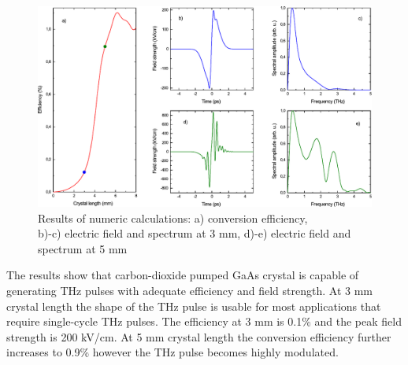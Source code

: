 \documentclass{article}
\begin{document}

\begin{figure}[H]\centering
\includegraphics[width=\textwidth]{graph1.pdf}
\caption{Results of numeric calculations: a) conversion efficiency, \\b)-c) electric field and spectrum at 3 mm, d)-e) electric field and spectrum at 5 mm}
\label{fig1}
\end{figure}


The results show that carbon\hyp{}dioxide pumped GaAs crystal is capable of generating THz pulses with adequate efficiency and field strength. At 3 mm crystal length the shape of the THz pulse is usable for most applications that require single-cycle THz pulses. The efficiency at 3 mm is 0.1\% and the peak field strength is 200 kV/cm. At 5 mm crystal length the conversion efficiency further increases to 0.9\% however the THz pulse becomes highly modulated.

\begin{flushleft}
\printbibliography[title=\normalsize References]
\end{flushleft}
\end{document}
